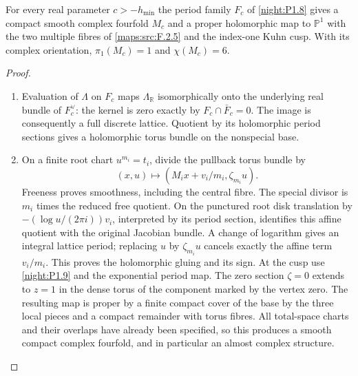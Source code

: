 \begin{theorem}\hypertarget{tag-02QJ}{}\label{night:P1.10}
For every real parameter $c>-h_{\min}$ the period family $F_c$ of \cref{night:P1.8} gives a compact smooth complex fourfold $M_c$ and a proper holomorphic map
to $\mathbb P^1$ with the two multiple fibres of \cref{maps:src:F.2.5} and the
index-one Kuhn cusp.  With its complex orientation,
$\pi_1(M_c)=1$ and $\chi(M_c)=6$.
\end{theorem}
\begin{proof}
\begin{enumerate}[label={$\langle1\rangle$\arabic*.}]
\item Evaluation of $\Lambda$ on $F_c$ maps $\Lambda_{\mathbb R}$
isomorphically onto the underlying real bundle of $F_c^\vee$:
the kernel is zero exactly by $F_c\cap\bar F_c=0$.
The image is consequently a full discrete lattice.  Quotient by its
holomorphic period sections gives a holomorphic torus bundle on the
nonspecial base.

\item On a finite root chart $u^{m_i}=t_i$, divide the pullback torus bundle by
\[
(x,u)\longmapsto(M_ix+v_i/m_i,\zeta_{m_i}u).
\]
Freeness proves smoothness, including the central fibre.  The special
divisor is $m_i$ times the reduced free quotient.  On the punctured
root disk translation by
$-(\log u/(2\pi i))v_i$, interpreted by its period section, identifies
this affine quotient with the original Jacobian bundle.  A change of
logarithm gives an integral lattice period; replacing $u$ by
$\zeta_{m_i}u$ cancels exactly the affine term $v_i/m_i$.
This proves the holomorphic gluing and its sign.
At the cusp use \cref{night:P1.9} and the exponential period map.  The zero section
$\zeta=0$ extends to $z=1$ in the dense torus of the component marked
by the vertex zero.  The resulting map is proper by a finite compact
cover of the base by the three local pieces and a compact remainder
with torus fibres.  All total-space charts and their overlaps have
already been specified, so this produces a smooth compact complex
fourfold, and in particular an almost complex structure.


\end{enumerate}
\end{proof}
